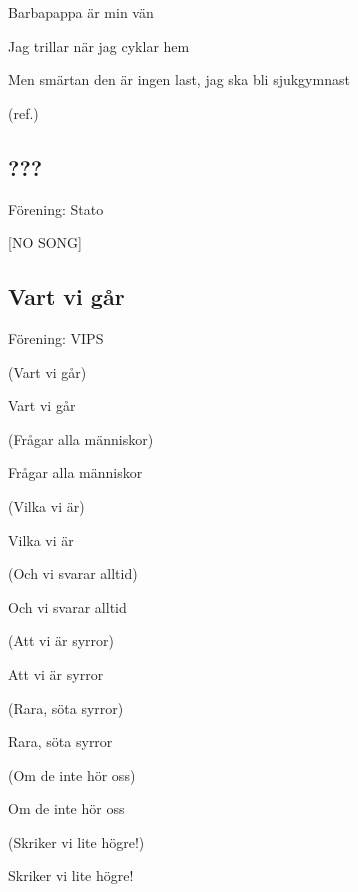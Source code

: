 Barbapappa är min vän

Jag trillar när jag cyklar hem

Men smärtan den är ingen last, jag ska bli sjukgymnast\bigskip

(ref.)\bigskip

\subsection{\textbf{???}}

Förening: Stato

[NO SONG]

\subsection{\textbf{Vart vi går}}

Förening: VIPS

(Vart vi går)

Vart vi går

(Frågar alla människor)

Frågar alla människor\bigskip

(Vilka vi är)

Vilka vi är

(Och vi svarar alltid)

Och vi svarar alltid\bigskip

(Att vi är syrror)

Att vi är syrror

(Rara, söta syrror)

Rara, söta syrror\bigskip

(Om de inte hör oss)

Om de inte hör oss

(Skriker vi lite högre!)

Skriker vi lite högre!\bigskip




\newpage